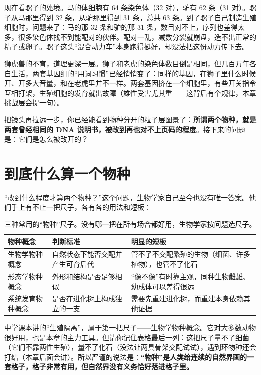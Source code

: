 现在看骡子的处境。马的体细胞有 64 条染色体（32 对），驴有 62 条（31 对）。骡子从马那里得到 32 条，从驴那里得到 31 条，总共 63 条。到了骡子自己制造生殖细胞时，问题来了：马的那 32 条和驴的那 31 条，数目对不上，序列也差得太多，很多染色体找不到能配对的伙伴。配对一乱，减数分裂就崩盘，造不出正常的精子或卵子。骡子这头“混合动力车”本身跑得挺好，却没法把这份动力传下去。

狮虎兽的不育，道理更深一层。狮子和老虎的染色体数目倒是相同，但几百万年各自生活，两套基因组的“用词习惯”已经悄悄变了：同样的基因，在狮子里什么时候开、开多大音量，和在老虎里并不一样。两套基因挤在一个细胞里，有些开关指令互相打架，生殖细胞的发育就出故障（雄性受害尤其重——这背后有个规律，本章挑战层会提一句）。

把镜头再拉远一步，你已经能看到物种分开的粒子层图景了：\textbf{所谓两个物种，就是两套曾经相同的 DNA 说明书，被改到再也对不上页码的程度}。接下来的问题是：它们是怎么被改开的？

\section{到底什么算一个物种}

“改到什么程度才算两个物种？”这个问题，生物学家自己至今也没有唯一答案。他们手上有不止一把尺子，各有各的用法和短板：

\begin{table}[htbp]
\centering
\begin{tabular}{p{3.2cm}p{4.6cm}p{4.6cm}}
\toprule
物种概念 & 判断标准 & 明显的短板 \\
\midrule
生物学物种概念 & 自然状态下能否交配并产生可育后代 & 管不了不交配繁殖的生物（细菌、许多植物），也管不了化石 \\
形态学物种概念 & 外形和结构是否足够相似 & “像不像”有时靠主观，同种生物雌雄、幼成体可以差得很远 \\
系统发育物种概念 & 是否在进化树上构成独立的一支 & 需要先重建进化树，而重建本身依赖其他证据 \\
\bottomrule
\end{tabular}
\caption{三种常用的“物种”尺子。没有哪一把在所有场合都好用，生物学家按问题选尺子。}
\end{table}

中学课本讲的“生殖隔离”，属于第一把尺子——生物学物种概念。它对大多数动物很好用，也是本章的主力工具。但请你记住表格最后一列：这把尺子量不了细菌（它们不靠两性生殖），量不了化石（没法让两具骨架交配试试），遇到环物种还会打结（本章后面会讲）。所以严谨的说法是：\textbf{“物种”是人类给连续的自然界画的一套格子，格子非常有用，但自然界没有义务恰好落进格子里。}

